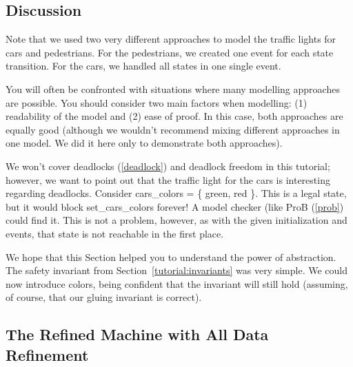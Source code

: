 \subsection{Discussion}

Note that we used two very different approaches to model the traffic lights for cars and pedestrians.  For the pedestrians, we created one event for each state transition.  For the cars, we handled all states in one single event.

You will often be confronted with situations where many modelling approaches are possible.  You should consider two main factors when modelling: (1) readability of the model and (2) ease of proof.  In this case, both approaches are equally good (although we wouldn't recommend mixing different approaches in one model.  We did it here only to demonstrate both approaches).

We won't cover deadlocks (\ref{deadlock}) and deadlock freedom in this tutorial; however, we want to point out that the traffic light for the cars is interesting regarding deadlocks.  Consider \textsf{cars\_colors = \{ green, red \}}. This is a legal state, but it would block \textsf{set\_cars\_colors} forever!  A model checker (like ProB (\ref{prob}) could find it.  This is not a problem, however, as with the given initialization and events, that state is not reachable in the first place.

We hope that this Section helped you to understand the power of abstraction.  The safety invariant from Section~\ref{tutorial:invariants} was very simple.  We could now introduce colors, being confident that the invariant will still hold (assuming, of course, that our gluing invariant is correct).

\subsection{The Refined Machine with All Data Refinement}

